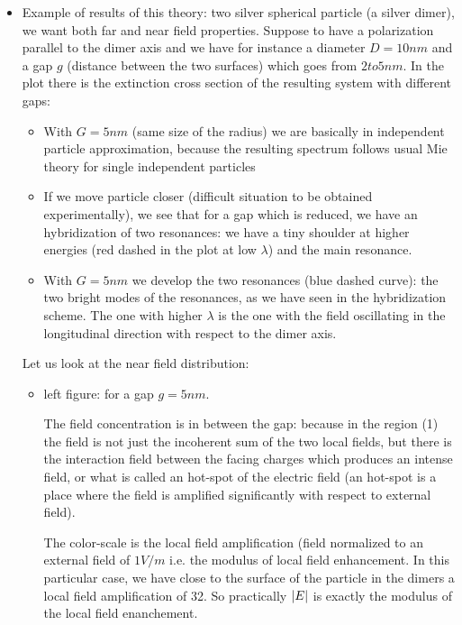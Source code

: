 \documentclass[../main/main.tex]{subfiles}
\begin{document}
\begin{itemize}
    \item Example of results of this theory: two silver spherical particle (a silver dimer), we want both far and near field properties.
    Suppose to have a polarization parallel to the dimer axis and we have for instance a diameter $D = 10 nm$ and a gap \( g \) (distance between the two surfaces) which goes from $2 to 5 nm$.
    In the plot there is the extinction cross section of the resulting system with different gaps:

\begin{itemize}
    \item With $G=5 nm$ (same size of the radius) we are basically in independent particle approximation, because the resulting spectrum follows usual Mie theory for single independent particles
    \item If we move particle closer (difficult situation to be obtained experimentally), we see that for a gap which is reduced, we have an hybridization of two resonances: we have a tiny shoulder at higher energies (red dashed in the plot at low $\lambda$) and the main resonance.
    \item With  $G=5 nm$ we develop the two resonances (blue dashed curve): the two bright modes of the resonances, as we have seen in the hybridization scheme. The one with higher $\lambda$ is the one with the field oscillating in the longitudinal direction with respect to the dimer axis.
\end{itemize}

Let us look at the near field distribution:

\begin{itemize}
    \item{left figure: for a gap $g = 5 nm$}.

    The field concentration is in between the gap: because in the region (1) the field is not just the incoherent sum of the two local fields, but there is the interaction field between the facing charges which produces an intense field, or what is called an hot-spot of the electric field (an hot-spot is a place where the field is amplified significantly with respect to external field).

    The color-scale is the local field amplification (field normalized to an external field of $1 V/m$ i.e. the modulus of local field enhancement. In this particular case, we have close to the surface of the particle in the dimers a local field amplification of 32.
    So practically \( \abs{E}  \) is exactly the modulus of the local field enanchement.


\end{itemize}
\end{itemize}
\end{document}
